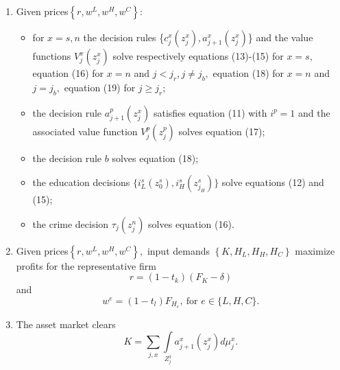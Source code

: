 \documentclass[a4paper,dvips,12pt]{article}
\begin{document}
\begin{enumerate}
\item Given prices$\left\{ r,w^{L},w^{H},w^{C}\right\}:$

\begin{itemize}
\item for $x=s,n$ the decision rules \{$%
c^{x}_{j}(z^{x}_{j}),a^{x}_{j+1}(z^{x}_{j}) $\} and the value functions $%
V^{x}_{j}(z^{x}_{j})$ solve respectively equations (13)-(15) for $x=s$, equation (16) for $x=n$ and $j<j_{r},j\neq
j_{b},$ equation (18) for $x=n$ and $j=j_{b},$ equation (19)
for $j\geq j_{r};$

\item the decision rule $a^{p}_{j+1}(z^{x}_{j})$ satisfies equation (11)
  with $i^p=1$ and the associated value function $%
  V^{p}_{j}(z^{p}_{j})$ solves equation (17);

\item the decision rule $b$ solves equation (18);

\item the education decisions $\{i^{s}_{L}(z^{s}_{0}),i^{s}_{H}(z^{s}_{j_H})%
\}$ solve equations (12) and (15);

\item the crime decision $\tau_{j}(z^{n}_{j})$ solves equation (16).
\end{itemize}

\item Given prices$\left\{ r,w^{L},w^{H},w^{C}\right\},$ input demands $%
\left\{ K,H_{L},H_{H},H_{C}\right\} $ maximize profits for the
representative firm
\begin{equation*}
r=(1-t_{k})(F_{K}-\delta)  \label{fock}
\end{equation*}
and
\begin{equation*}
w^{e} =(1-t_{l})F_{H_{e}},\ \text{for } e\in \{L,H,C\}.
\end{equation*}

\item The asset market clears
\begin{equation*}
K=\sum_{j,x} \int \limits_{Z^{x}_{j}}a^{x}_{j+1}(z^{x}_{j})d\mu^{x}_{j}.
\end{equation*}%



\end{enumerate}
\end{document}
